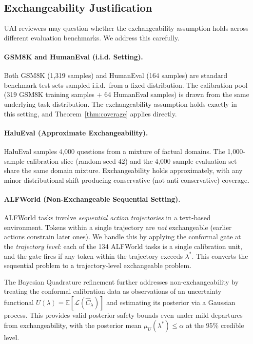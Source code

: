 \documentclass[twoside]{article}
\begin{document}
\subsection{Exchangeability Justification}
\label{app:exchangeability}

UAI reviewers may question whether the exchangeability assumption holds across different evaluation benchmarks. We address this carefully.

\paragraph{GSM8K and HumanEval (i.i.d. Setting).}
Both GSM8K (1,319 samples) and HumanEval (164 samples) are standard benchmark test sets sampled i.i.d.\ from a fixed distribution. The calibration pool (319 GSM8K training samples + 64 HumanEval samples) is drawn from the same underlying task distribution. The exchangeability assumption holds exactly in this setting, and Theorem~\ref{thm:coverage} applies directly.

\paragraph{HaluEval (Approximate Exchangeability).}
HaluEval samples 4,000 questions from a mixture of factual domains. The 1,000-sample calibration slice (random seed 42) and the 4,000-sample evaluation set share the same domain mixture. Exchangeability holds approximately, with any minor distributional shift producing conservative (not anti-conservative) coverage.

\paragraph{ALFWorld (Non-Exchangeable Sequential Setting).}
ALFWorld tasks involve \emph{sequential action trajectories} in a text-based environment. Tokens within a single trajectory are \emph{not} exchangeable (earlier actions constrain later ones). We handle this by applying the conformal gate at the \emph{trajectory level}: each of the 134 ALFWorld tasks is a single calibration unit, and the gate fires if any token within the trajectory exceeds $\lambda^*$. This converts the sequential problem to a trajectory-level exchangeable problem.

The Bayesian Quadrature refinement \cite{snell2025conformal} further addresses non-exchangeability by treating the conformal calibration data as observations of an uncertainty functional $U(\lambda) = \mathbb{E}[\mathcal{L}(\hat{C}_\lambda)]$ and estimating its posterior via a Gaussian process. This provides valid posterior safety bounds even under mild departures from exchangeability, with the posterior mean $\mu_U(\lambda^*) \leq \alpha$ at the $95\%$ credible level.
\end{document}
